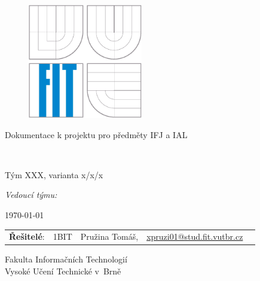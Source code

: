 \begin{titlepage}

\begin{figure}[!h]
  \centering
  \includegraphics[height=5cm]{img/logo.eps}
\end{figure}

\vfill

\begin{center}
\begin{Large}
Dokumentace k projektu pro předměty IFJ a IAL\\
\end{Large}
\bigskip
\begin{Huge}
\projname\\
\end{Huge}
\begin{large}
Tým XXX, varianta x/x/x\\
\end{large}
\textit{Vedoucí týmu: }\\
\end{center}

\vfill

\begin{center}
\begin{Large}
\today
\end{Large}
\end{center}

\vfill

\begin{flushleft}
\begin{tabular}{l l l l l}
\textbf{Řešitelé}: 
&1BIT& Pružina Tomáš, &\url{xpruzi01@stud.fit.vutbr.cz} \\
\end{tabular}
\vfill
\begin{large}
Fakulta Informačních Technologií \\
Vysoké Učení Technické v~Brně \\
\end{large}
\end{flushleft}
\end{titlepage}

